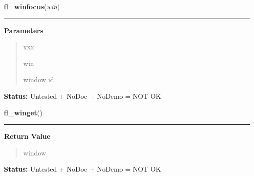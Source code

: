 \hspace{.8\funcindent}\begin{boxedminipage}{\funcwidth}

    \raggedright \textbf{fl\_winfocus}(\textit{win})

    \vspace{-1.5ex}

    \rule{\textwidth}{0.5\fboxrule}
\setlength{\parskip}{2ex}
\setlength{\parskip}{1ex}
      \textbf{Parameters}
      \vspace{-1ex}

      \begin{quote}
        \begin{Ventry}{xxx}

          \item[win]

          window id

        \end{Ventry}

      \end{quote}

\textbf{Status:} Untested + NoDoc + NoDemo = NOT OK



    \end{boxedminipage}

    \label{xformslib:library:fl_winget}

    \vspace{0.5ex}

\hspace{.8\funcindent}\begin{boxedminipage}{\funcwidth}

    \raggedright \textbf{fl\_winget}()

    \vspace{-1.5ex}

    \rule{\textwidth}{0.5\fboxrule}
\setlength{\parskip}{2ex}
\setlength{\parskip}{1ex}
      \textbf{Return Value}
    \vspace{-1ex}

      \begin{quote}
      window

      \end{quote}

\textbf{Status:} Untested + NoDoc + NoDemo = NOT OK



    \end{boxedminipage}

